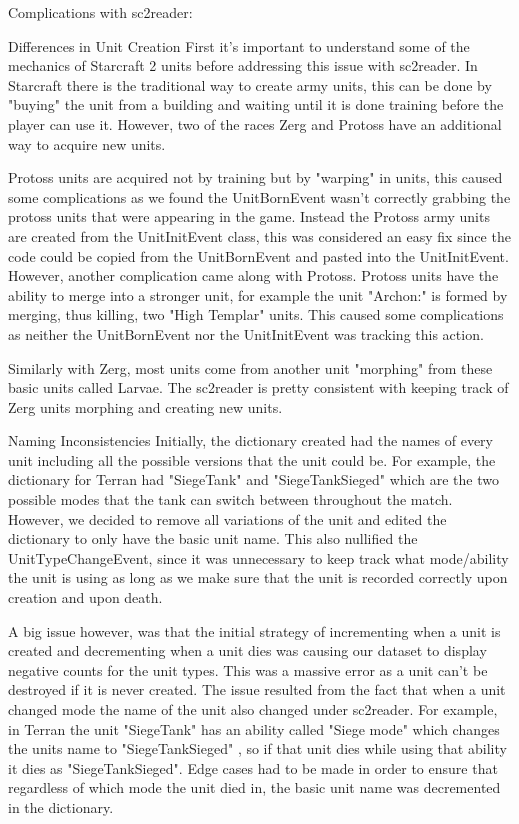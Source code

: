 \documentclass[a4paper,12pt]{report}
\begin{document}
Complications with sc2reader:

Differences in Unit Creation
First it’s important to understand some of the mechanics of Starcraft 2 units before addressing this issue with sc2reader. In Starcraft there is the traditional way to create army units, this can be done by "buying" the unit from a building and waiting until it is done training before the player can use it. However, two of the races Zerg and Protoss have an additional way to acquire new units. 

Protoss units are acquired not by training but by "warping" in units, this caused some complications as we found the UnitBornEvent wasn’t correctly grabbing the protoss units that were appearing in the game. Instead the Protoss army units are created from the UnitInitEvent class, this was considered an easy fix since the code could be copied from the UnitBornEvent and pasted into the UnitInitEvent. However, another complication came along with Protoss. Protoss units have the ability to merge into a stronger unit, for example the unit "Archon:" is formed by merging, thus killing, two "High Templar" units. This caused some complications as neither the UnitBornEvent nor the UnitInitEvent was tracking this action.

Similarly with Zerg, most units come from another unit "morphing" from these basic units called Larvae. The sc2reader is pretty consistent with keeping track of Zerg units morphing and creating new units.

 Naming Inconsistencies
Initially, the dictionary created had the names of every unit including all the possible versions that the unit could be. For example, the dictionary for Terran had "SiegeTank" and "SiegeTankSieged" which are the two possible modes that the tank can switch between throughout the match. However, we decided to remove all variations of the unit and edited the dictionary to only have the basic unit name. This also nullified the UnitTypeChangeEvent, since it was unnecessary to keep track what mode/ability the unit is using as long as we make sure that the unit is recorded correctly upon creation and upon death.

A big issue however, was that the initial strategy of incrementing when a unit is created and decrementing when a unit dies was causing our dataset to display negative counts for the unit types. This was a massive error as a unit can’t be destroyed if it is never created. The issue resulted from the fact that when a unit changed mode the name of the unit also changed under sc2reader. For example, in Terran the unit "SiegeTank" has an ability called "Siege mode" which changes the units name to "SiegeTankSieged" , so if that unit dies while using that ability it dies as "SiegeTankSieged". Edge cases had to be made in order to ensure that regardless of which mode the unit died in, the basic unit name was decremented in the dictionary.
\end{document}
